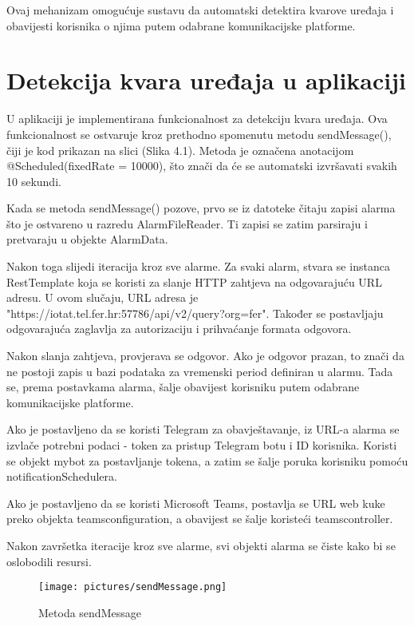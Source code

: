 \documentclass[times, utf8, zavrsni]{fer}
\begin{document}
Ovaj mehanizam omogućuje sustavu da automatski detektira kvarove uređaja i obavijesti korisnika o njima putem odabrane komunikacijske platforme.
\section{Detekcija kvara uređaja u aplikaciji}
U aplikaciji je implementirana funkcionalnost za detekciju kvara uređaja. Ova funkcionalnost se ostvaruje kroz prethodno spomenutu metodu {\selectfont sendMessage()}, čiji je kod prikazan na slici (Slika 4.1). Metoda je označena anotacijom @Scheduled(fixedRate = 10000), što znači da će se automatski izvršavati svakih 10 sekundi.

Kada se metoda {\selectfont sendMessage()} pozove, prvo se iz datoteke čitaju zapisi alarma što je ostvareno u razredu {\selectfont AlarmFileReader}. Ti zapisi se zatim parsiraju i pretvaraju u objekte {\selectfont AlarmData}.

Nakon toga slijedi iteracija kroz sve alarme. Za svaki alarm, stvara se instanca {\selectfont RestTemplate} koja se koristi za slanje HTTP zahtjeva na odgovarajuću URL adresu. U ovom slučaju, URL adresa je "https://iotat.tel.fer.hr:57786/api/v2/query?org=fer". Također se postavljaju odgovarajuća zaglavlja za autorizaciju i prihvaćanje formata odgovora.

Nakon slanja zahtjeva, provjerava se odgovor. Ako je odgovor prazan, to znači da ne postoji zapis u bazi podataka za vremenski period definiran u alarmu. Tada se, prema postavkama alarma, šalje obavijest korisniku putem odabrane komunikacijske platforme.

Ako je postavljeno da se koristi Telegram za obavještavanje, iz URL-a alarma se izvlače potrebni podaci - token za pristup Telegram botu i ID korisnika. Koristi se objekt {\selectfont mybot} za postavljanje tokena, a zatim se šalje poruka korisniku pomoću {\selectfont notificationSchedulera}.

Ako je postavljeno da se koristi Microsoft Teams, postavlja se URL web kuke preko objekta {\selectfont teamsconfiguration}, a obavijest se šalje koristeći {\selectfont teamscontroller}.

Nakon završetka iteracije kroz sve alarme, svi objekti alarma se čiste kako bi se oslobodili resursi.
\begin{figure}[h!]
			\texttt{[image: pictures/sendMessage.png]} %
		\centering
			\caption{Metoda sendMessage}
			\label{fig:promjene}
\end{figure}
\newpage
\end{document}
